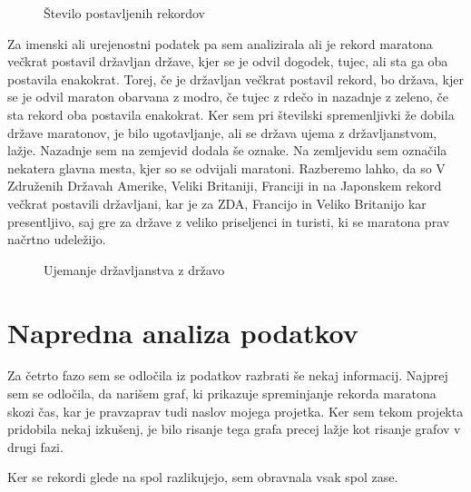 \documentclass[11pt,a4paper]{article}
\begin{document}
\begin{figure}[H]
  \caption{Število postavljenih rekordov}
  \label{fig:Zemljevid 1}
\end{figure}

Za imenski ali urejenostni podatek pa sem analizirala ali je rekord maratona večkrat postavil državljan države, kjer se je odvil dogodek, tujec, ali sta ga oba postavila enakokrat. Torej, če je državljan večkrat postavil rekord, bo država, kjer se je odvil maraton obarvana z modro, če tujec z rdečo in nazadnje z zeleno, če sta rekord oba postavila enakokrat.
Ker sem pri številski spremenljivki že dobila države maratonov, je bilo ugotavljanje, ali se država ujema z državljanstvom, lažje.
Nazadnje sem na zemjevid dodala še oznake. Na zemljevidu sem označila nekatera glavna mesta, kjer so se odvijali maratoni.
Razberemo lahko, da so V Združenih Državah Amerike, Veliki Britaniji, Franciji in na Japonskem rekord večkrat postavili državljani, kar je za ZDA, Francijo in Veliko Britanijo kar presentljivo, saj gre za države z veliko priseljenci in turisti, ki se maratona prav načrtno udeležijo. 

\begin{figure}[H]
  \caption{Ujemanje državljanstva z državo}
  \label{fig:Zemljevid 2}
\end{figure}

\newpage
\section{Napredna analiza podatkov}

Za četrto fazo sem se odločila iz podatkov razbrati še nekaj informacij. Najprej sem se odločila, da narišem graf, ki prikazuje spreminjanje rekorda maratona skozi čas, kar je pravzaprav tudi naslov mojega projetka. Ker sem tekom projekta pridobila nekaj izkušenj, je bilo risanje tega grafa precej lažje kot risanje grafov v drugi fazi.

Ker se rekordi glede na spol razlikujejo, sem obravnala vsak spol zase.
\end{document}
